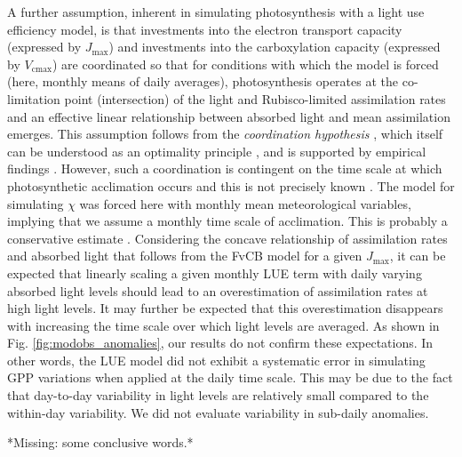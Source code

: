 \documentclass{myreport}
\newcommand{\vcmax}{$V_{\text{cmax}}$}
\newcommand{\jmax}{$J_{\text{max}}$}
\begin{document}
A further assumption, inherent in simulating photosynthesis with a light use efficiency model, is that investments into the electron transport capacity (expressed by \jmax ) and investments into the carboxylation capacity (expressed by \vcmax ) are coordinated so that for conditions with which the model is forced (here, monthly means of daily averages), photosynthesis operates at the co-limitation point (intersection) of the light and Rubisco-limited assimilation rates and an effective linear relationship between absorbed light and mean assimilation emerges. This assumption follows from the \textit{coordination hypothesis} \citep{chen93, haxeltine96}, which itself can be understood as an optimality principle \citep{chen93}, and is supported by empirical findings \citep{maire12po}. However, such a coordination is contingent on the time scale at which photosynthetic acclimation occurs and this is not precisely known \citep{smithdukes13gcb, way14}. The model for simulating $\chi$ was forced here with monthly mean meteorological variables, implying that we assume a monthly time scale of acclimation. This is probably a conservative estimate \citep{smithdukes17, veres84}. Considering the concave relationship of assimilation rates and absorbed light that follows from the FvCB model for a given \jmax , it can be expected that linearly scaling a given monthly LUE term with daily varying absorbed light levels should lead to an overestimation of assimilation rates at high light levels. It may further be expected that this overestimation disappears with increasing the time scale over which light levels are averaged. As shown in Fig. \ref{fig:modobs_anomalies}, our results do not confirm these expectations. In other words, the LUE model did not exhibit a systematic error in simulating GPP variations when applied at the daily time scale. This may be due to the fact that day-to-day variability in light levels are relatively small compared to the within-day variability. We did not evaluate variability in sub-daily anomalies.

*Missing: some conclusive words.*
\end{document}
